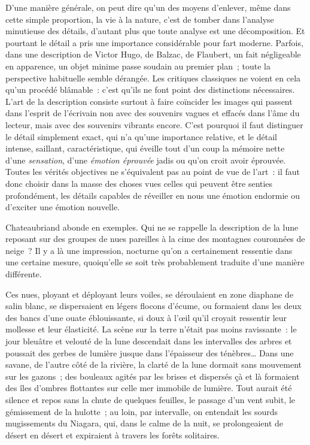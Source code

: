 \documentclass[french,twoside]{book} %
\newenvironment{quoteblock}%
  {\begin{quoting}}
  {\end{quoting}}
\newenvironment{quotebar}{%
    \def\FrameCommand{{\color{rubric!10!}\vrule width 0.5em} \hspace{0.9em}}%
    \def\OuterFrameSep{\itemsep} %
    \MakeFramed {\advance\hsize-\width \FrameRestore}
  }%
  {%
    \endMakeFramed
  }
\renewenvironment{quoteblock}%
  {%
    \savenotes
    \setstretch{0.9}
    \normalfont
    \begin{quotebar}
  }
  {%
    \end{quotebar}
    \spewnotes
  }
\begin{document}
D’une manière générale, on peut dire qu’un des moyens d’enlever, même dans cette simple proportion, la vie à la nature, c’est de tomber dans l’analyse minutieuse des détails, d’autant plus que toute analyse est une décomposition. Et pourtant le détail a pris une importance considérable pour fart moderne. Parfois, dans une description de Victor Hugo, de Balzac, de Flaubert, un fait négligeable en apparence, un objet minime passe soudain au premier plan ; toute la perspective habituelle semble dérangée. Les critiques classiques ne voient en cela qu’un procédé blâmable : c’est qu’ils ne font point des distinctions nécessaires. L’art de la description consiste surtout à faire coïncider les images qui passent dans l’esprit de l’écrivain non avec des souvenirs vagues et effacés dans l’âme du lecteur, mais avec des souvenirs vibrants encore. C’est pourquoi il faut distinguer le détail simplement exact, qui n’a qu’une importance relative, et le détail intense, saillant, caractéristique, qui éveille tout d’un coup la mémoire nette d’une \emph{sensation}, d’une \emph{émotion éprouvée} jadis ou qu’on croit avoir éprouvée. Toutes les vérités objectives ne s’équivalent pas au point de vue de l’art : il faut donc choisir dans la masse des choses vues celles qui peuvent être senties profondément, les détails capables de réveiller en nous une émotion endormie ou d’exciter une émotion nouvelle.\par
Chateaubriand abonde en exemples. Qui ne se rappelle la description de la lune reposant sur des groupes de nues pareilles à la cime des montagnes couronnées de neige ? Il y a là une impression, nocturne qu’on a certainement ressentie dans une certaine mesure, quoiqu’elle se soit très probablement traduite d’une manière différente.\par

\begin{quoteblock}
 \noindent Ces nues, ployant et déployant leurs voiles, se déroulaient en zone diaphane de salin blanc, se dispersaient en légers flocons d’écume, ou formaient dans les deux des bancs d’une ouate éblouissante, si doux à l’œil qu’il croyait ressentir leur mollesse et leur élasticité. La scène sur la terre n’était pas moins ravissante : le jour bleuâtre et velouté de la lune descendait dans les intervalles des arbres et poussait des gerbes de lumière jusque dans l’épaisseur des ténèbres… Dans une savane, de l’autre côté de la rivière, la clarté de la lune dormait sans mouvement sur les gazons ; des bouleaux agités par les brises et dispersés çà et là formaient des îles d’ombres flottantes sur celle mer immobile de lumière. Tout aurait été silence et repos sans la chute de quelques feuilles, le passage d’un vent subit, le gémissement de la hulotte ; au loin, par intervalle, on entendait les sourds mugissements du Niagara, qui, dans le calme de la nuit, se prolongeaient de désert en désert et expiraient à travers les forêts solitaires.
 \end{quoteblock}
\end{document}
